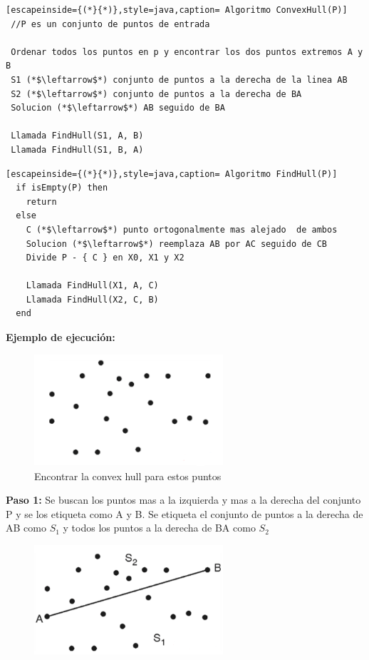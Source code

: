 \begin{enumerate}[a)]
\begin{lstlisting}[escapeinside={(*}{*)},style=java,caption= Algoritmo ConvexHull(P)]
 //P es un conjunto de puntos de entrada

 Ordenar todos los puntos en p y encontrar los dos puntos extremos A y B
 S1 (*$\leftarrow$*) conjunto de puntos a la derecha de la linea AB
 S2 (*$\leftarrow$*) conjunto de puntos a la derecha de BA
 Solucion (*$\leftarrow$*) AB seguido de BA

 Llamada FindHull(S1, A, B)
 Llamada FindHull(S1, B, A)
\end{lstlisting}

\begin{lstlisting}[escapeinside={(*}{*)},style=java,caption= Algoritmo FindHull(P)]
  if isEmpty(P) then
    return
  else
    C (*$\leftarrow$*) punto ortogonalmente mas alejado  de ambos
    Solucion (*$\leftarrow$*) reemplaza AB por AC seguido de CB
    Divide P - { C } en X0, X1 y X2

    Llamada FindHull(X1, A, C)
    Llamada FindHull(X2, C, B)
  end
 \end{lstlisting}

 \textbf{Ejemplo de ejecución: }

 \begin{figure}[!htb]
  \centering
  \includegraphics[width=7cm, scale=1]{Images/Punto3/ej1.png}
  \caption{Encontrar la convex hull para estos puntos}
\end{figure}

\textbf{Paso 1: }Se buscan los puntos mas a la izquierda y mas a la derecha del conjunto P y se los etiqueta como A y B. Se etiqueta el conjunto de puntos a la derecha de AB como $S_1$ y todos los puntos a la derecha de BA como $S_2$

\begin{figure}[!htb]
  \centering
  \includegraphics[width=7cm, scale=1]{Images/Punto3/ej2.png}
  \caption{}
\end{figure}


\end{enumerate}
